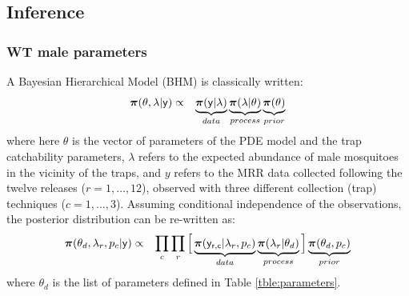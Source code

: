 \documentclass[]{bmcart}
\begin{document}
\subsection{Inference}
\subsubsection{WT male parameters}
A Bayesian Hierarchical Model (BHM) is classically written:
  \begin{eqnarray}
{\bm \pi}(\theta, \lambda | {\sf y}) &\propto & \underbrace{{\bm \pi}({\sf y} | \lambda)}_{data} \underbrace{{\bm \pi}(\lambda | \theta)}_{process} \underbrace{{\bm \pi}( \theta)}_{prior} 
\end{eqnarray}
where here $\theta$ is the vector of parameters of the PDE model and the trap catchability parameters, $\lambda$ refers to the expected abundance of male mosquitoes in the vicinity of the traps, and $y$ refers to the MRR data collected following the twelve releases ($r = {1, \dots, 12}$), observed with three different collection (trap) techniques ($c = {1, \dots, 3}$). Assuming conditional independence of the observations, the posterior distribution can be re-written as:
\begin{eqnarray}
{\bm \pi}(\theta_d, {\lambda_r}, {p_c} | {\sf y}) &\propto & \prod_c \prod_r \Big[  \underbrace{{\bm \pi}({\sf y_{r,c}} | \lambda_r, p_c)}_{data} \underbrace{{\bm \pi}(\lambda_r | \theta_d)}_{process} \Big] \underbrace{{\bm \pi}( \theta_d, p_c)}_{prior} 
\end{eqnarray}
where $\theta_d$ is the list of parameters defined in Table \ref{tble:parameters}.
\end{document}
